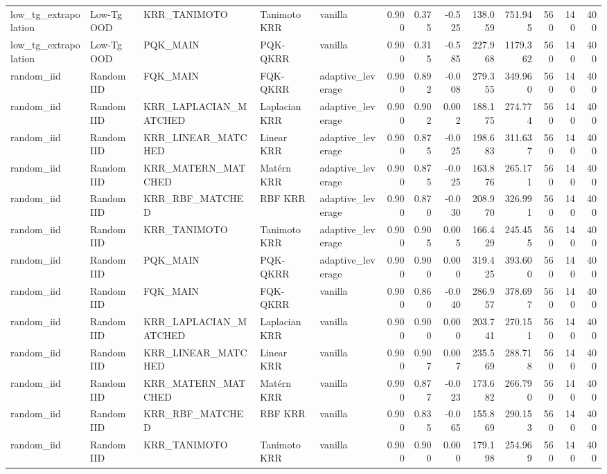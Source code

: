 \begin{tabular}{lllllrrrrrrrr}
low\_tg\_extrapolation & Low-Tg OOD & KRR\_TANIMOTO & Tanimoto KRR & vanilla & 0.900 & 0.375 & -0.525 & 138.059 & 751.945 & 560 & 140 & 400 \\
low\_tg\_extrapolation & Low-Tg OOD & PQK\_MAIN & PQK-QKRR & vanilla & 0.900 & 0.315 & -0.585 & 227.968 & 1179.362 & 560 & 140 & 400 \\
random\_iid & Random IID & FQK\_MAIN & FQK-QKRR & adaptive\_leverage & 0.900 & 0.892 & -0.008 & 279.355 & 349.960 & 560 & 140 & 400 \\
random\_iid & Random IID & KRR\_LAPLACIAN\_MATCHED & Laplacian KRR & adaptive\_leverage & 0.900 & 0.902 & 0.002 & 188.175 & 274.774 & 560 & 140 & 400 \\
random\_iid & Random IID & KRR\_LINEAR\_MATCHED & Linear KRR & adaptive\_leverage & 0.900 & 0.875 & -0.025 & 198.683 & 311.637 & 560 & 140 & 400 \\
random\_iid & Random IID & KRR\_MATERN\_MATCHED & Matérn KRR & adaptive\_leverage & 0.900 & 0.875 & -0.025 & 163.876 & 265.171 & 560 & 140 & 400 \\
random\_iid & Random IID & KRR\_RBF\_MATCHED & RBF KRR & adaptive\_leverage & 0.900 & 0.870 & -0.030 & 208.970 & 326.991 & 560 & 140 & 400 \\
random\_iid & Random IID & KRR\_TANIMOTO & Tanimoto KRR & adaptive\_leverage & 0.900 & 0.905 & 0.005 & 166.429 & 245.455 & 560 & 140 & 400 \\
random\_iid & Random IID & PQK\_MAIN & PQK-QKRR & adaptive\_leverage & 0.900 & 0.900 & 0.000 & 319.425 & 393.600 & 560 & 140 & 400 \\
random\_iid & Random IID & FQK\_MAIN & FQK-QKRR & vanilla & 0.900 & 0.860 & -0.040 & 286.957 & 378.697 & 560 & 140 & 400 \\
random\_iid & Random IID & KRR\_LAPLACIAN\_MATCHED & Laplacian KRR & vanilla & 0.900 & 0.900 & 0.000 & 203.741 & 270.151 & 560 & 140 & 400 \\
random\_iid & Random IID & KRR\_LINEAR\_MATCHED & Linear KRR & vanilla & 0.900 & 0.907 & 0.007 & 235.569 & 288.718 & 560 & 140 & 400 \\
random\_iid & Random IID & KRR\_MATERN\_MATCHED & Matérn KRR & vanilla & 0.900 & 0.877 & -0.023 & 173.682 & 266.790 & 560 & 140 & 400 \\
random\_iid & Random IID & KRR\_RBF\_MATCHED & RBF KRR & vanilla & 0.900 & 0.835 & -0.065 & 155.869 & 290.153 & 560 & 140 & 400 \\
random\_iid & Random IID & KRR\_TANIMOTO & Tanimoto KRR & vanilla & 0.900 & 0.900 & 0.000 & 179.198 & 254.969 & 560 & 140 & 400 \\

\end{tabular}

